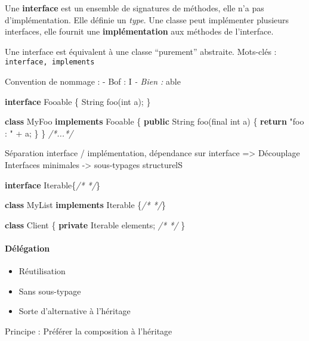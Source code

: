 \documentclass[]{article}
\newenvironment{Shaded}{}{}
\newcommand{\KeywordTok}[1]{\textcolor[rgb]{0.00,0.44,0.13}{\textbf{{#1}}}}
\newcommand{\DataTypeTok}[1]{\textcolor[rgb]{0.56,0.13,0.00}{{#1}}}
\newcommand{\StringTok}[1]{\textcolor[rgb]{0.25,0.44,0.63}{{#1}}}
\newcommand{\CommentTok}[1]{\textcolor[rgb]{0.38,0.63,0.69}{\textit{{#1}}}}
\newcommand{\FunctionTok}[1]{\textcolor[rgb]{0.02,0.16,0.49}{{#1}}}
\newcommand{\NormalTok}[1]{{#1}}
\begin{document}
Une \textbf{interface} est un ensemble de signatures de méthodes, elle
n'a pas d'implémentation. Elle définie un \emph{type}. Une classe peut
implémenter plusieurs interfaces, elle fournit une
\textbf{implémentation} aux méthodes de l'interface.

Une interface est équivalent à une classe ``purement'' abstraite.
Mots-clés : \texttt{interface,\ implements}

Convention de nommage : - Bof : I\emph{ - Bien : }able

\begin{Shaded}
\begin{Highlighting}[]
\KeywordTok{interface} \NormalTok{Fooable \{}
    \NormalTok{String }\FunctionTok{foo}\NormalTok{(}\DataTypeTok{int} \NormalTok{a);}
\NormalTok{\}}

\KeywordTok{class} \NormalTok{MyFoo }\KeywordTok{implements} \NormalTok{Fooable \{}
    \KeywordTok{public} \NormalTok{String }\FunctionTok{foo}\NormalTok{(}\DataTypeTok{final} \DataTypeTok{int} \NormalTok{a) \{}
        \KeywordTok{return} \StringTok{"foo : "} \NormalTok{+ a;}
    \NormalTok{\}}
\NormalTok{\}}
\CommentTok{/*...*/}
\end{Highlighting}
\end{Shaded}

Séparation interface / implémentation, dépendance sur interface
=\textgreater{} Découplage Interfaces minimales -\textgreater{}
sous-typages structurelS

\begin{Shaded}
\begin{Highlighting}[]
\KeywordTok{interface} \NormalTok{Iterable\{}\CommentTok{/* */}\NormalTok{\}}

\KeywordTok{class} \NormalTok{MyList }\KeywordTok{implements} \NormalTok{Iterable \{}\CommentTok{/* */}\NormalTok{\}}

\KeywordTok{class} \NormalTok{Client \{}
    \KeywordTok{private} \NormalTok{Iterable elements;}
    \CommentTok{/* */}
\NormalTok{\}}
\end{Highlighting}
\end{Shaded}

\paragraph{Délégation}\label{duxe9luxe9gation}

\begin{itemize}
\itemsep1pt\parskip0pt
\item
  Réutilisation
\item
  Sans sous-typage
\item
  Sorte d'alternative à l'héritage
\end{itemize}

Principe : Préférer la composition à l'héritage
\end{document}
